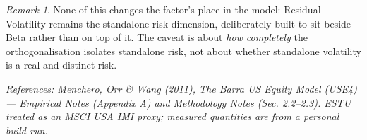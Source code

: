 \documentclass[11pt]{article}
\theoremstyle{definition}
\theoremstyle{plain}
\theoremstyle{remark}
\newtheorem*{remark}{Remark}
\begin{document}
\begin{remark}
None of this changes the factor's place in the model: Residual Volatility remains the standalone-risk dimension, deliberately built to sit beside Beta rather than on top of it. The caveat is about \emph{how completely} the orthogonalisation isolates standalone risk, not about whether standalone volatility is a real and distinct risk.
\end{remark}

\begin{center}\small\itshape
References: Menchero, Orr \& Wang (2011), \textit{The Barra US Equity Model (USE4)} --- Empirical Notes (Appendix A) and Methodology Notes (Sec. 2.2--2.3). ESTU treated as an MSCI USA IMI proxy; measured quantities are from a personal build run.
\end{center}
\end{document}

